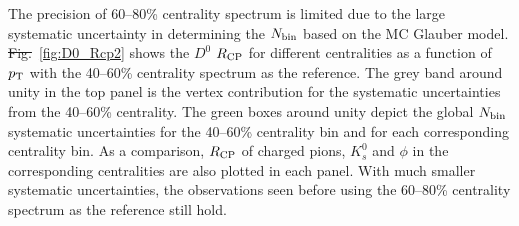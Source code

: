 \documentclass[%
 reprint,	
 amsmath,amssymb,
 aps,
 prc,
]{revtex4-1}
\providecommand{\DIFaddtex}[1]{{\protect\color{blue}\uwave{#1}}} %
\providecommand{\DIFdeltex}[1]{{\protect\color{red}\sout{#1}}}                      %
\providecommand{\DIFaddbegin}{} %
\providecommand{\DIFaddend}{} %
\providecommand{\DIFdelbegin}{} %
\providecommand{\DIFdelend}{} %
\providecommand{\DIFadd}[1]{\texorpdfstring{\DIFaddtex{#1}}{#1}} %
\providecommand{\DIFdel}[1]{\texorpdfstring{\DIFdeltex{#1}}{}} %
\begin{document}
The precision of \DIFaddbegin \DIFadd{the }\DIFaddend 60--80\% centrality spectrum is limited due to the large systematic uncertainty in determining the $N_{\rm bin}$ based on the MC Glauber model. \DIFdelbegin \DIFdel{Fig.}\DIFdelend \DIFaddbegin \DIFadd{Figure}\DIFaddend ~\ref{fig:D0_Rcp2} shows the $D^0$ $R_{\rm CP}$ for different centralities as a function of \DIFdelbegin \DIFdel{$p_{\rm T}$ }\DIFdelend \DIFaddbegin \DIFadd{$p_{T}$ }\DIFaddend with the 40--60\% centrality spectrum as the reference. The grey band around unity in the top panel is the vertex contribution for the systematic uncertainties from the 40--60\% centrality. The green boxes around unity depict the global $N_{\rm bin}$ systematic uncertainties for the 40--60\% centrality bin and for each corresponding centrality bin. As a comparison, $R_{\rm CP}$ of charged pions, $K_{s}^{0}$ and $\phi$ in the corresponding centralities are also plotted in each panel. With much smaller systematic uncertainties, the observations seen before using the 60--80\% centrality spectrum as the reference still hold. 


\end{document}
